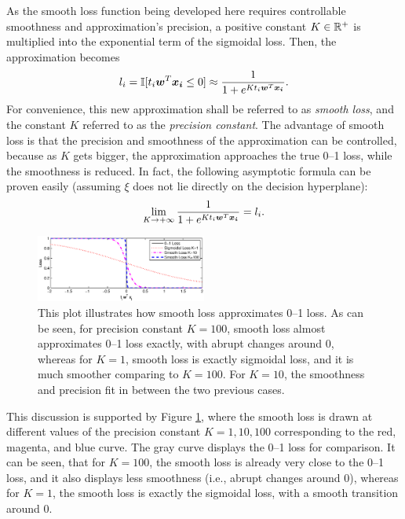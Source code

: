 As the smooth loss function being developed here requires controllable smoothness and approximation's precision, a positive constant $K \in \mathbb{R}^+$ is multiplied into the exponential term of the sigmoidal loss. Then, the approximation becomes
$$l_i = \mathbb{I} [t_i \boldsymbol{w}^T \boldsymbol{x_i} \leq 0] \approx \frac{1}{1 + e^{Kt_i
    \boldsymbol{w}^T \boldsymbol{x_i} }}.$$ For convenience, this new approximation shall be
referred to as \emph{smooth loss}, and the constant $K$ referred to as
the \emph{precision constant}. The advantage of smooth loss is that
the precision and smoothness of the approximation can be controlled,
because as $K$ gets bigger, the approximation approaches the true 0--1
loss, while the smoothness is reduced. In fact, the following
asymptotic formula can be proven easily (assuming $\xi$ does not lie
directly on the decision hyperplane):
$$\lim_{K \rightarrow +\infty} \frac{1}{1 + e^{Kt_i \boldsymbol{w}^T \boldsymbol{x_i} }} = l_i.$$

\begin{figure}[here]
\includegraphics[width=0.50\textwidth]{images/fig52_smooth.eps}
\caption{
This plot illustrates how smooth loss approximates 0--1 loss. As can be seen, for precision constant $K=100$, smooth loss almost approximates 0--1 loss exactly, with abrupt changes around 0, whereas for $K=1$, smooth loss is exactly sigmoidal loss, and it is much smoother comparing to $K=100$. For $K=10$, the smoothness and precision fit in between the two previous cases. 
}
\label{fig:sla.smooth}
\end{figure}

This discussion is supported by Figure \ref{fig:sla.smooth}, where the smooth loss is drawn at different values of the precision constant $K=1, 10, 100$ corresponding to the red, magenta, and blue curve. The gray curve displays the 0--1 loss for comparison. It can be seen, that for $K=100$, the smooth loss is already very close to the 0--1 loss, and it also displays less smoothness (i.e., abrupt changes around 0), whereas for $K=1$, the smooth loss is exactly the sigmoidal loss, with a smooth transition around 0.



